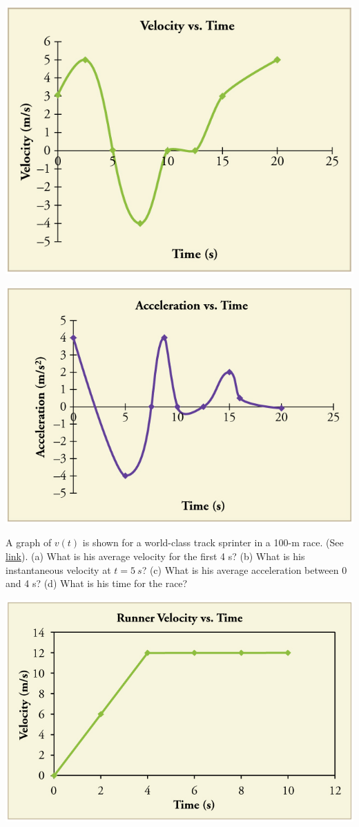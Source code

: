 \documentclass[
]{book}
\begin{document}
\includegraphics{images/Figure_02_08Sol_17.jpg}

\includegraphics{images/Figure_02_08Sol_18.jpg}

\hypertarget{fs-id3520768}{}
\leavevmode{}%
A graph of \({v\left( t \right)}{}\) is shown for a world-class track
sprinter in a 100-m race. (See
\protect\hyperlink{import-auto-id4125036}{link}). (a) What is his
average velocity for the first 4 s? (b) What is his instantaneous
velocity at \({t = 5\ s}{}\)? (c) What is his average acceleration between
0 and 4 s? (d) What is his time for the race?

\includegraphics{images/Figure_02_08Sol_20.jpg}
\end{document}
